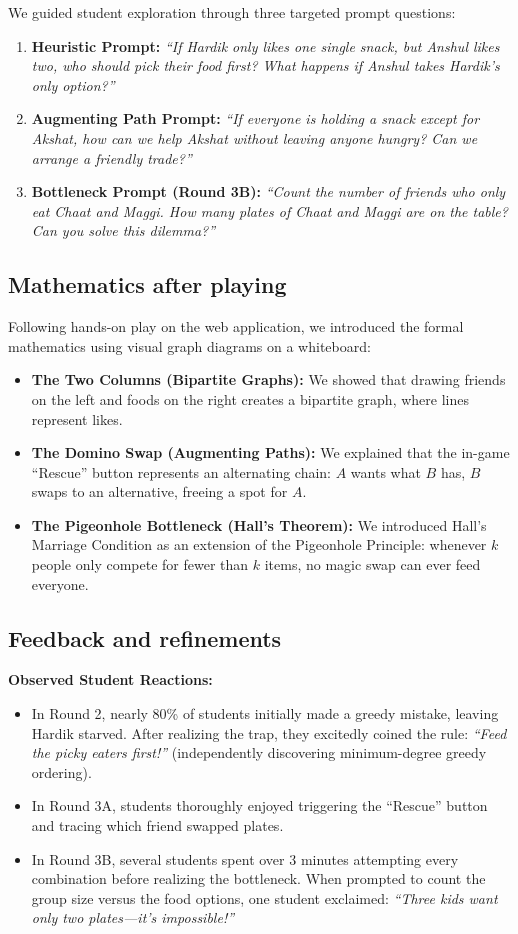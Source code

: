 \documentclass[11pt,a4paper]{article}
\begin{document}
We guided student exploration through three targeted prompt questions:
\begin{enumerate}
  \item \textbf{Heuristic Prompt:} \textit{``If Hardik only likes one single snack, but Anshul likes two, who should pick their food first? What happens if Anshul takes Hardik's only option?''}
  \item \textbf{Augmenting Path Prompt:} \textit{``If everyone is holding a snack except for Akshat, how can we help Akshat without leaving anyone hungry? Can we arrange a friendly trade?''}
  \item \textbf{Bottleneck Prompt (Round 3B):} \textit{``Count the number of friends who only eat Chaat and Maggi. How many plates of Chaat and Maggi are on the table? Can you solve this dilemma?''}
\end{enumerate}

\subsection*{Mathematics after playing}
Following hands-on play on the web application, we introduced the formal mathematics using visual graph diagrams on a whiteboard:
\begin{itemize}
  \item \textbf{The Two Columns (Bipartite Graphs):} We showed that drawing friends on the left and foods on the right creates a bipartite graph, where lines represent likes.
  \item \textbf{The Domino Swap (Augmenting Paths):} We explained that the in-game ``Rescue'' button represents an alternating chain: $A$ wants what $B$ has, $B$ swaps to an alternative, freeing a spot for $A$.
  \item \textbf{The Pigeonhole Bottleneck (Hall's Theorem):} We introduced Hall's Marriage Condition as an extension of the Pigeonhole Principle: whenever $k$ people only compete for fewer than $k$ items, no magic swap can ever feed everyone.
\end{itemize}

\subsection*{Feedback and refinements}
\textbf{Observed Student Reactions:}
\begin{itemize}
  \item In Round 2, nearly 80\% of students initially made a greedy mistake, leaving Hardik starved. After realizing the trap, they excitedly coined the rule: \emph{``Feed the picky eaters first!''} (independently discovering minimum-degree greedy ordering).
  \item In Round 3A, students thoroughly enjoyed triggering the ``Rescue'' button and tracing which friend swapped plates.
  \item In Round 3B, several students spent over 3 minutes attempting every combination before realizing the bottleneck. When prompted to count the group size versus the food options, one student exclaimed: \emph{``Three kids want only two plates---it's impossible!''}
\end{itemize}
\end{document}
